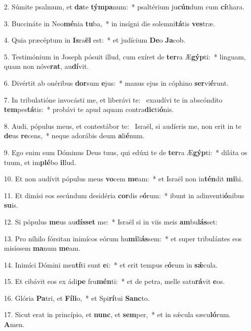 2. Súmite psalmum, et \textbf{da}te \textbf{tým}\textbf{pa}num:~*  psaltérium ju\textbf{cún}dum cum \textbf{cí}thara.\

3. Buccináte in Neo\textbf{mé}nia \textbf{tu}ba,~*  in insígni die solemni\textbf{tá}tis \textbf{ves}træ.\

4. Quia præcéptum in \textbf{Is}ra\textbf{ël} est:~*  et judícium \textbf{De}o \textbf{Ja}cob.\

5. Testimónium in Joseph pósuit illud, cum exíret de \textbf{ter}ra Æ\textbf{gýp}ti:~*  linguam, quam non nóve\textbf{rat}, au\textbf{dí}vit.\

6. Divértit ab onéribus \textbf{dor}sum \textbf{e}jus:~*  manus ejus in cóphino \textbf{ser}vi\textbf{é}runt.\

7. In tribulatióne invocásti me, et liberávi te: \dag\  exaudívi te in abscóndito \textbf{tem}pes\textbf{tá}tis:~*  probávi te apud aquam contra\textbf{dic}ti\textbf{ó}nis.\

8. Audi, pópulus meus, et contestábor te: \dag\  Israël, si audíeris me, non erit in te \textbf{de}us \textbf{re}cens,~*  neque adorábis deum \textbf{a}li\textbf{é}num.\

9. Ego enim sum Dóminus Deus tuus, qui edúxi te de \textbf{ter}ra Æ\textbf{gýp}ti:~*  diláta os tuum, et im\textbf{plé}bo \textbf{il}lud.\

10. Et non audívit pópulus meus \textbf{vo}cem \textbf{me}am:~*  et Israël non in\textbf{tén}dit \textbf{mi}hi.\

11. Et dimísi eos secúndum desidéria \textbf{cor}dis e\textbf{ó}rum:~*  ibunt in adinventi\textbf{ó}nibus \textbf{su}is.\

12. Si pópulus \textbf{me}us au\textbf{dís}\textbf{set} me:~*  Israël si in viis meis \textbf{am}bu\textbf{lás}set:\

13. Pro níhilo fórsitan inimícos eórum hu\textbf{mi}li\textbf{ás}sem:~*  et super tribulántes eos misíssem \textbf{ma}num \textbf{me}am.\

14. Inimíci Dómini men\textbf{tí}ti sunt \textbf{e}i:~*  et erit tempus e\textbf{ó}rum in \textbf{sǽ}cula.\

15. Et cibávit eos ex ádi\textbf{pe} fru\textbf{mén}ti:~*  et de petra, melle satu\textbf{rá}vit \textbf{e}os.\

16. Glória \textbf{Pa}tri, et \textbf{Fí}\textbf{li}o,~*  et Spi\textbf{rí}tui \textbf{Sanc}to.\

17. Sicut erat in princípio, et \textbf{nunc}, et \textbf{sem}per,~*  et in sǽcula sæcu\textbf{ló}rum. \textbf{A}men.\

